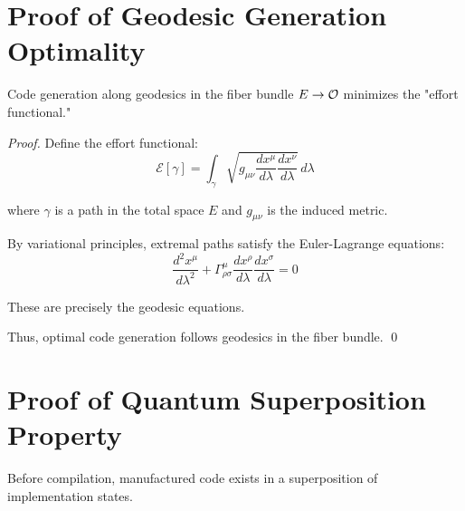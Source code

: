 \section{Proof of Geodesic Generation Optimality}

\begin{theorem}
Code generation along geodesics in the fiber bundle $E \to \mathcal{O}$ minimizes the "effort functional."
\end{theorem}

\begin{proof}
Define the effort functional:
\begin{equation}
\mathcal{E}[\gamma] = \int_{\gamma} \sqrt{g_{\mu\nu} \frac{dx^\mu}{d\lambda} \frac{dx^\nu}{d\lambda}} \, d\lambda
\end{equation}

where $\gamma$ is a path in the total space $E$ and $g_{\mu\nu}$ is the induced metric.

By variational principles, extremal paths satisfy the Euler-Lagrange equations:
\begin{equation}
\frac{d^2 x^\mu}{d\lambda^2} + \Gamma^\mu_{\rho\sigma} \frac{dx^\rho}{d\lambda} \frac{dx^\sigma}{d\lambda} = 0
\end{equation}

These are precisely the geodesic equations.

Thus, optimal code generation follows geodesics in the fiber bundle.
\qed
\end{proof}

\section{Proof of Quantum Superposition Property}

\begin{proposition}
Before compilation, manufactured code exists in a superposition of implementation states.
\end{proposition}

